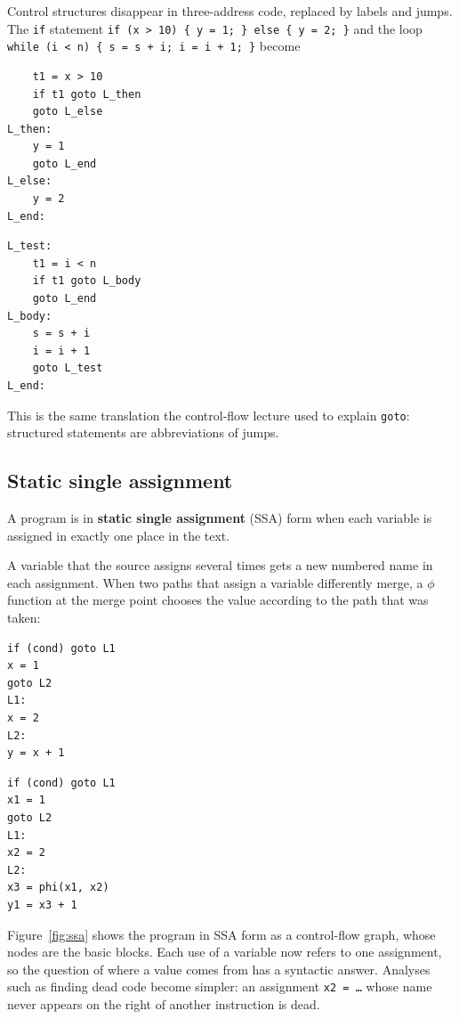 Control structures disappear in three-address code, replaced by labels and
jumps. The \texttt{if} statement \texttt{if (x > 10) \{ y = 1; \} else \{ y = 2; \}}
and the loop \texttt{while (i < n) \{ s = s + i; i = i + 1; \}} become
\begin{center}
\begin{minipage}[t]{0.4\textwidth}
\begin{lstlisting}
    t1 = x > 10
    if t1 goto L_then
    goto L_else
L_then:
    y = 1
    goto L_end
L_else:
    y = 2
L_end:
\end{lstlisting}
\end{minipage}
\hspace{1cm}
\begin{minipage}[t]{0.4\textwidth}
\begin{lstlisting}
L_test:
    t1 = i < n
    if t1 goto L_body
    goto L_end
L_body:
    s = s + i
    i = i + 1
    goto L_test
L_end:
\end{lstlisting}
\end{minipage}
\end{center}
This is the same translation the control-flow lecture used to explain
\texttt{goto}: structured statements are abbreviations of jumps.

\subsection{Static single assignment}

\begin{definition}
A program is in \textbf{static single assignment} (SSA) form when each
variable is assigned in exactly one place in the text.
\end{definition}

A variable that the source assigns several times gets a new numbered name in
each assignment. When two paths that assign a variable differently merge, a
$\phi$ function at the merge point chooses the value according to the path
that was taken:
\begin{center}
\begin{minipage}[t]{0.35\textwidth}
\begin{lstlisting}
if (cond) goto L1
x = 1
goto L2
L1:
x = 2
L2:
y = x + 1
\end{lstlisting}
\end{minipage}
\hspace{1cm}
\begin{minipage}[t]{0.45\textwidth}
\begin{lstlisting}
if (cond) goto L1
x1 = 1
goto L2
L1:
x2 = 2
L2:
x3 = phi(x1, x2)
y1 = x3 + 1
\end{lstlisting}
\end{minipage}
\end{center}
Figure~\ref{fig:ssa} shows the program in SSA form as a control-flow graph,
whose nodes are the basic blocks. Each use of a variable now refers to one
assignment, so the question of where a value comes from has a syntactic
answer. Analyses such as finding dead code become simpler: an assignment
\texttt{x2 = \dots} whose name never appears on the right of another
instruction is dead.

